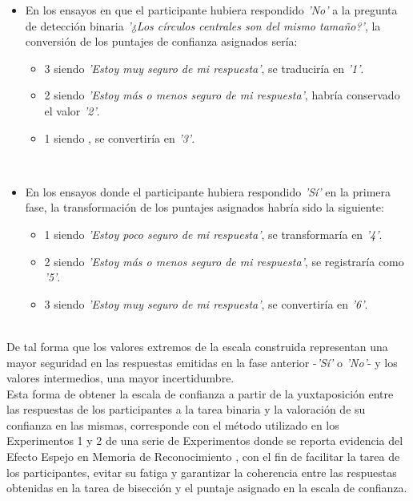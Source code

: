 \begin{itemize}
\begin{itemize}
\begin{itemize}
\item En los ensayos en que el participante hubiera respondido \textit{'No'} a la pregunta de detección binaria \textit{'¿Los círculos centrales son del mismo tamaño?'}, la conversión de los puntajes de confianza asignados sería:\\
	\begin{itemize}
	\item 3 siendo \textit{'Estoy muy seguro de mi respuesta'}, se traduciría en \textit{'1'}.\\
	\item 2 siendo \textit{'Estoy más o menos seguro de mi respuesta'}, habría conservado el valor \textit{'2'}.\\
	\item 1 siendo , se convertiría en \textit{'3'}.\\
	\end{itemize}
\\
\item En los ensayos donde el participante hubiera respondido \textit{'Sí'} en la primera fase, la transformación de los puntajes asignados habría sido la siguiente:\\
	\begin{itemize}
	\item 1 siendo \textit{'Estoy poco seguro de mi respuesta'}, se transformaría en \textit{'4'}.\\
	\item 2 siendo \textit{'Estoy más o menos seguro de mi respuesta'}, se registraría como \textit{'5'}.\\
	\item 3 siendo \textit{'Estoy muy seguro de mi respuesta'}, se convertiría en \textit{'6'}.\\
	\end{itemize}
\end{itemize}\\

De tal forma que los valores extremos de la escala construida representan una mayor seguridad en las respuestas emitidas en la fase anterior -\textit{'Sí'} o \textit{'No'}- y los valores intermedios, una mayor incertidumbre.\\

Esta forma de obtener la escala de confianza a partir de la yuxtaposición entre las respuestas de los participantes a la tarea binaria y la valoración de su confianza en las mismas, corresponde con el método utilizado en los Experimentos 1 y 2 de una serie de Experimentos donde se reporta evidencia del Efecto Espejo  en Memoria de Reconocimiento \parencite{Glanzer1990}, con el fin de facilitar la tarea de los participantes, evitar su fatiga y garantizar la coherencia entre las respuestas obtenidas en la tarea de bisección y el puntaje asignado en la escala de confianza.\\


\end{itemize}
\end{itemize}
